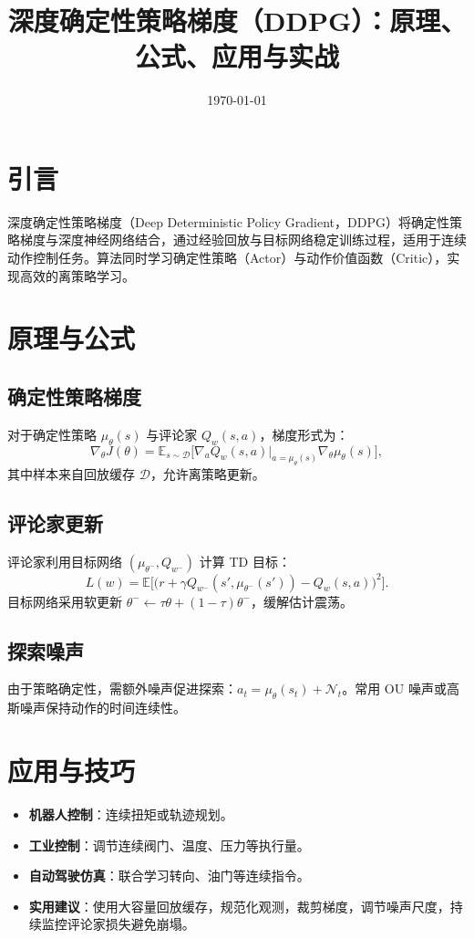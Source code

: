 \documentclass[UTF8,zihao=-4]{ctexart}
\title{深度确定性策略梯度（DDPG）：原理、公式、应用与实战}
\author{}
\date{\today}
\begin{document}
\maketitle

\section{引言}
深度确定性策略梯度（Deep Deterministic Policy Gradient，DDPG）将确定性策略梯度与深度神经网络结合，通过经验回放与目标网络稳定训练过程，适用于连续动作控制任务。算法同时学习确定性策略（Actor）与动作价值函数（Critic），实现高效的离策略学习。

\section{原理与公式}
\subsection{确定性策略梯度}
对于确定性策略 \(\mu_\theta(s)\) 与评论家 \(Q_w(s,a)\)，梯度形式为：
\begin{equation}
\nabla_\theta J(\theta) = \mathbb{E}_{s \sim \mathcal{D}}\big[ \nabla_a Q_w(s,a)|_{a=\mu_\theta(s)} \nabla_\theta \mu_\theta(s) \big],
\end{equation}
其中样本来自回放缓存 \(\mathcal{D}\)，允许离策略更新。

\subsection{评论家更新}
评论家利用目标网络 \((\mu_{\theta^-}, Q_{w^-})\) 计算 TD 目标：
\begin{equation}
L(w) = \mathbb{E}\Big[\big(r + \gamma Q_{w^-}(s', \mu_{\theta^-}(s')) - Q_w(s,a)\big)^2\Big].
\end{equation}
目标网络采用软更新 \(\theta^- \leftarrow \tau \theta + (1-\tau)\theta^-\)，缓解估计震荡。

\subsection{探索噪声}
由于策略确定性，需额外噪声促进探索：\(a_t = \mu_\theta(s_t) + \mathcal{N}_t\)。常用 OU 噪声或高斯噪声保持动作的时间连续性。

\section{应用与技巧}
\begin{itemize}
  \item \textbf{机器人控制}：连续扭矩或轨迹规划。
  \item \textbf{工业控制}：调节连续阀门、温度、压力等执行量。
  \item \textbf{自动驾驶仿真}：联合学习转向、油门等连续指令。
  \item \textbf{实用建议}：使用大容量回放缓存，规范化观测，裁剪梯度，调节噪声尺度，持续监控评论家损失避免崩塌。
\end{itemize}
\end{document}
